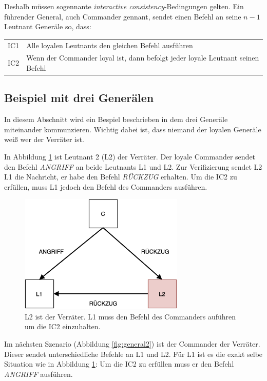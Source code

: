 \documentclass{article}
\begin{document}
\medskip 

Deshalb müssen sogennante \textit{interactive consistency}-Bedingungen gelten.
Ein führender General, auch Commander gennant, sendet einen Befehl an seine $n - 1$ Leutnant 
Generäle so, dass:

\smallskip 

\begin{tabular}{l l}
IC1 & Alle loyalen Leutnants den gleichen Befehl ausführen \\
IC2 & Wenn der Commander loyal ist, dann befolgt jeder loyale Leutnant seinen Befehl
\end{tabular}

\subsection{Beispiel mit drei Generälen}
In diesem Abschnitt wird ein Bespiel beschrieben in dem drei Generäle miteinander kommunzieren. 
Wichtig dabei ist, dass niemand der loyalen Generäle weiß wer der Verräter ist. 

\medskip

In Abbildung \ref{fig:general1} ist Leutnant 2 (L2) der Verräter. Der loyale Commander
sendet den Befehl \textit{ANGRIFF} an beide Leutnants L1 und L2. Zur Verifizierung sendet L2 L1 die Nachricht,
er habe den Befehl \textit{RÜCKZUG} erhalten. Um die IC2 zu erfüllen, muss L1 jedoch
den Befehl des Commanders ausführen. 

\begin{figure}[H]
    \centering
    \includegraphics[width=0.7\textwidth]{general1.png}
    \caption{L2 ist der Verräter. L1 muss den Befehl des Commanders auführen um die IC2 einzuhalten.}
    \label{fig:general1}
\end{figure}

Im nächsten Szenario (Abbildung \ref{fig:general2}) ist der Commander der Verräter. Dieser sendet unterschiedliche 
Befehle an L1 und L2. Für L1 ist es die exakt selbe Situation 
wie in Abbildung \ref{fig:general1}: Um die IC2 zu erfüllen muss er den Befehl \textit{ANGRIFF} ausführen. 
\end{document}
